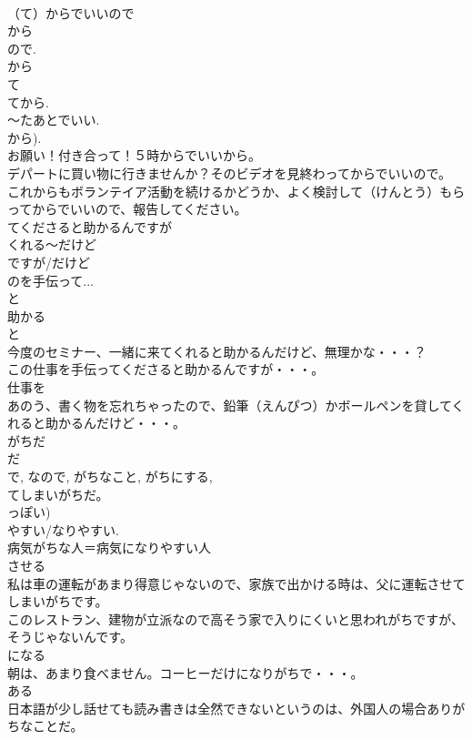 \documentclass[8pt]{extreport}
\begin{document}
\begin{CJK}{UTF8}{min}
\\	（て）からでいいので 
\\	から 
\\	ので. 
\\	から 
\\	て 
\\	てから. 
\\	～たあとでいい. 
\\	から). 
\\	お願い！付き合って！５時からでいいから。 
\\	デパートに買い物に行きませんか？そのビデオを見終わってからでいいので。 
\\	これからもボランテイア活動を続けるかどうか、よく検討して（けんとう）もらってからでいいので、報告してください。 
\\	てくださると助かるんですが	
\\	くれる～だけど 
\\	ですが/だけど 
\\	のを手伝って... 
\\	と 
\\	助かる 
\\	と
\\	今度のセミナー、一緒に来てくれると助かるんだけど、無理かな・・・？ 
\\	この仕事を手伝ってくださると助かるんですが・・・。 
\\	仕事を 
\\	あのう、書く物を忘れちゃったので、鉛筆（えんぴつ）かボールペンを貸してくれると助かるんだけど・・・。 
\\	がちだ	
\\	だ 
\\	で, なので, がちなこと, がちにする, 
\\	てしまいがちだ。 
\\	っぽい) 
\\	やすい/なりやすい. 
\\	病気がちな人＝病気になりやすい人 
\\	させる 
\\	私は車の運転があまり得意じゃないので、家族で出かける時は、父に運転させてしまいがちです。 
\\	このレストラン、建物が立派なので高そう家で入りにくいと思われがちですが、そうじゃないんです。 
\\	になる 
\\	朝は、あまり食べません。コーヒーだけになりがちで・・・。 
\\	ある 
\\	日本語が少し話せても読み書きは全然できないというのは、外国人の場合ありがちなことだ。 

\end{CJK}
\end{document}
